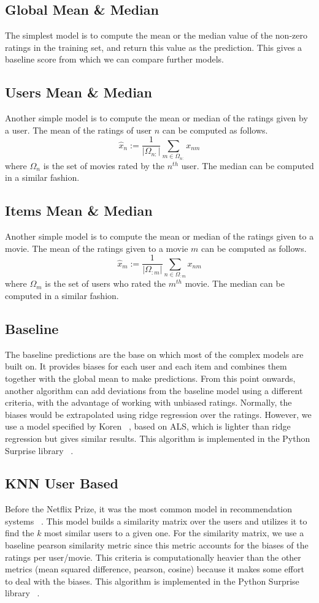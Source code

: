 \documentclass[10pt,conference,compsocconf]{IEEEtran}
\begin{document}
\subsection{Global Mean \& Median}
The simplest model is to compute the mean or the median value of the non-zero ratings in the training set, and return this value as the prediction. This gives a baseline score from which we can compare further models. 
\subsection{Users Mean \& Median}
Another simple model is to compute the mean or median of the ratings given by a user. The mean of the ratings of user $n$ can be computed as follows.
\begin{equation}
\hat{x}_n := \frac{1}{|\Omega_{n:}|} \sum_{m \in \Omega_{n:}}{} x_{nm}
\end{equation}
where $\Omega_{n}$ is the set of movies rated by the $n^{th}$ user. The median can be computed in a similar fashion.
\subsection{Items Mean \& Median}
Another simple model is to compute the mean or median of the ratings given to a movie. The mean of the ratings given to a movie $m$ can be computed as follows. 
\begin{equation}
\hat{x}_m:= \frac{1}{|\Omega_{:m}|} \sum_{n \in \Omega_{:m}}{} x_{nm}
\end{equation}
where $\Omega_{m}$  is the set of users who rated the $m^{th}$ movie. The median can be computed in a similar fashion.
\subsection{Baseline}
The baseline predictions are the base on which most of the complex models are built on. It provides biases for each user and each item and combines them together with the global mean to make predictions. From this point onwards, another algorithm can add deviations from the baseline model using a different criteria, with the advantage of working with unbiased ratings. Normally, the biases would be extrapolated using ridge regression over the ratings. However, we use a model specified by Koren ~\cite{koren2010factor}, based on ALS, which is lighter than ridge regression but gives similar results. This algorithm is implemented in the Python Surprise library ~\cite{Surprise}.
\subsection{KNN User Based}
Before the Netflix Prize, it was the most common model in recommendation systems ~\cite{koren2010factor}. This model builds a similarity matrix over the users and utilizes it to find the $k$ most similar users to a given one. For the similarity matrix, we use a baseline pearson similarity metric since this metric accounts for the biases of the ratings per user/movie. This criteria is computationally heavier than the other metrics (mean squared difference, pearson, cosine) because it makes some effort to deal with the biases. This algorithm is implemented in the Python Surprise library ~\cite{Surprise}.
\end{document}
